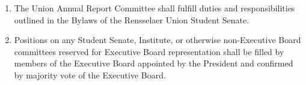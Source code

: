 \begin{enumerate}
\begin{enumerate}
\begin{enumerate}
    \end{enumerate}
  \item The purpose of this committee shall be to expedite the budgeting and hiring process of the Board.
  \item The votes and decisions of this committee are to be considered the votes and decisions of the Board.
  \item While in this committee, the Board shall adopt special rules of procedure.
    \begin{enumerate}
    \item The Board will follow procedure as if in a committee.
    \item The chair, if they so desire, may instruct the Parliamentarian to maintain a queue.
    \end{enumerate}
  \item Upon the conclusion of the budgeting session, or by a majority vote of the committee, the committee shall rise, and normal Board procedures shall resume.
  \end{enumerate}
\item The Union Annual Report Committee shall fulfill duties and responsibilities outlined in the Bylaws of the Rensselaer Union Student Senate.
\item Positions on any Student Senate, Institute, or otherwise non-Executive Board committees reserved for Executive Board representation shall be filled by members of the Executive Board appointed by the President and confirmed by majority vote of the Executive Board.
\end{enumerate}
